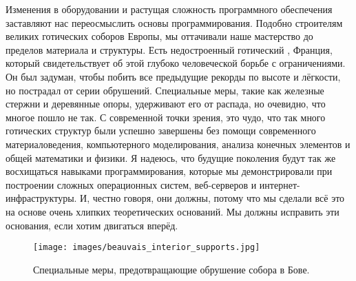Изменения в оборудовании и растущая сложность программного обеспечения заставляют 
нас переосмыслить основы программирования. Подобно строителям великих готических 
соборов Европы, мы оттачивали наше мастерство до пределов материала и структуры. 
Есть недостроенный готический , Франция, который свидетельствует об этой глубоко человеческой борьбе 
с ограничениями. Он был задуман, чтобы побить все предыдущие рекорды по высоте 
и лёгкости, но пострадал от серии обрушений. Специальные меры, такие как железные 
стержни и деревянные опоры, удерживают его от распада, но очевидно, что многое 
пошло не так. С современной точки зрения, это чудо, что так много готических 
структур были успешно завершены без помощи современного материаловедения, 
компьютерного моделирования, анализа конечных элементов и общей математики и 
физики. Я надеюсь, что будущие поколения будут так же восхищаться навыками 
программирования, которые мы демонстрировали при построении сложных операционных 
систем, веб-серверов и интернет-инфраструктуры. И, честно говоря, они должны, 
потому что мы сделали всё это на основе очень хлипких теоретических оснований. 
Мы должны исправить эти основания, если хотим двигаться вперёд.

\begin{figure}
  \centering
  \texttt{[image: images/beauvais\_interior\_supports.jpg]}
  \caption{Специальные меры, предотвращающие обрушение собора в Бове.}
\end{figure}
